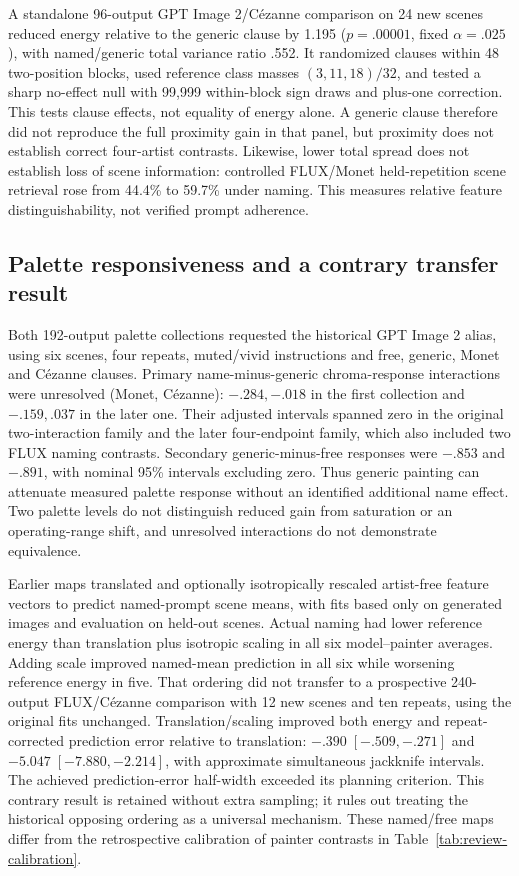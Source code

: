 \documentclass[11pt]{article}
\begin{document}
A standalone 96-output GPT Image 2/C\'ezanne comparison on 24 new scenes reduced energy
relative to the generic clause by 1.195 ($p=.00001$, fixed $\alpha=.025$), with
named/generic total variance ratio .552. It randomized clauses within 48 two-position
blocks, used reference class masses $(3,11,18)/32$, and tested a sharp no-effect
null with 99,999 within-block sign draws and plus-one correction. This tests
clause effects, not equality of energy alone. A generic clause therefore did
not reproduce the full proximity gain in that panel, but proximity does not
establish correct four-artist contrasts. Likewise, lower total spread does
not establish loss of scene information: controlled FLUX/Monet held-repetition
scene retrieval rose from 44.4\% to 59.7\% under naming. This measures relative
feature distinguishability, not verified prompt adherence.

\subsection{Palette responsiveness and a contrary transfer result}
Both 192-output palette collections requested the historical GPT Image 2 alias,
using six scenes, four repeats, muted/vivid instructions and free, generic,
Monet and C\'ezanne clauses. Primary name-minus-generic chroma-response
interactions were unresolved (Monet, C\'ezanne):
$-.284,-.018$ in the first collection and $-.159,.037$ in the later one.
Their adjusted intervals spanned zero in the original two-interaction family and the later four-endpoint
family, which also included two FLUX naming contrasts.
Secondary generic-minus-free responses were $-.853$ and $-.891$, with nominal
95\% intervals excluding zero. Thus generic painting can attenuate measured
palette response without an identified additional name effect. Two palette
levels do not distinguish reduced gain from saturation or an operating-range
shift, and unresolved interactions do not demonstrate equivalence.

Earlier maps translated and optionally isotropically rescaled artist-free feature
vectors to predict named-prompt scene means, with fits based only on generated
images and evaluation on held-out scenes. Actual naming had lower reference energy than
translation plus isotropic scaling in all six model--painter averages. Adding
scale improved named-mean prediction in all six while worsening reference
energy in five. That ordering did not transfer to a prospective 240-output
FLUX/C\'ezanne comparison with 12 new scenes and ten repeats, using the original
fits unchanged. Translation/scaling improved both energy and repeat-corrected
prediction error relative to translation: $-.390\;[-.509,-.271]$ and
$-5.047\;[-7.880,-2.214]$, with approximate simultaneous jackknife intervals.
The achieved prediction-error half-width exceeded its planning criterion.
This contrary result is retained without extra sampling; it rules out treating
the historical opposing ordering as a universal mechanism. These named/free maps
differ from the retrospective calibration of painter contrasts in
Table~\ref{tab:review-calibration}.
\end{document}
